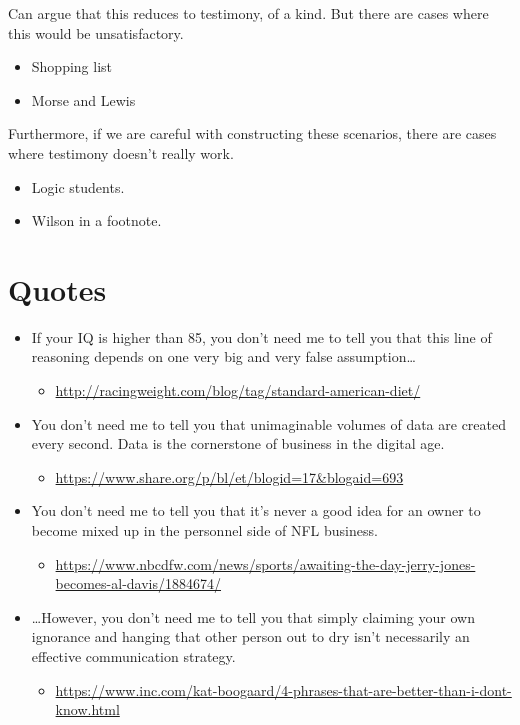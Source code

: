 \documentclass[10pt]{article}
\begin{document}
{
  \color{red}
  Can argue that this reduces to testimony, of a kind.
  But there are cases where this would be unsatisfactory.
  \begin{itemize}
  \item Shopping list
  \item Morse and Lewis
  \end{itemize}
  Furthermore, if we are careful with constructing these scenarios, there are cases where testimony doesn't really work.
  \begin{itemize}
  \item Logic students.
  \item Wilson in a footnote.
  \end{itemize}
}


\newpage

\section*{Quotes}
\label{sec:quotes}

\begin{itemize}
\item If your IQ is higher than 85, you don’t need me to tell you that this line of reasoning depends on one very big and very false assumption\dots
  \begin{itemize}
  \item \url{http://racingweight.com/blog/tag/standard-american-diet/}
  \end{itemize}
\item You don’t need me to tell you that unimaginable volumes of data are created every second. Data is the cornerstone of business in the digital age.
  \begin{itemize}
  \item \url{https://www.share.org/p/bl/et/blogid=17&blogaid=693}
  \end{itemize}
\item You don’t need me to tell you that it’s never a good idea for an owner to become mixed up in the personnel side of NFL business.
  \begin{itemize}
  \item \url{https://www.nbcdfw.com/news/sports/awaiting-the-day-jerry-jones-becomes-al-davis/1884674/}
  \end{itemize}
\item \dots However, you don't need me to tell you that simply claiming your own ignorance and hanging that other person out to dry isn't necessarily an effective communication strategy.
  \begin{itemize}
  \item \url{https://www.inc.com/kat-boogaard/4-phrases-that-are-better-than-i-dont-know.html}
  \end{itemize}
\end{itemize}
\end{document}

